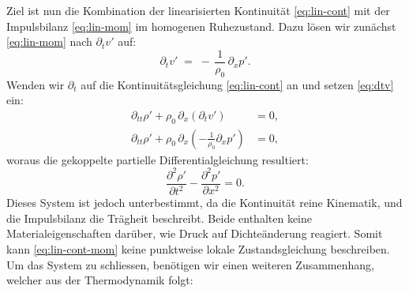 Ziel ist nun die Kombination der linearisierten Kontinuität \eqref{eq:lin-cont}
mit der Impulsbilanz \eqref{eq:lin-mom} im homogenen Ruhezustand.
Dazu lösen wir zunächst \eqref{eq:lin-mom} nach $\partial_t v'$ auf:
\begin{equation}
    \partial_t v' \;=\; -\,\frac{1}{\rho_0}\,\partial_x p'.
    \label{eq:dtv}
\end{equation}
Wenden wir $\partial_t$ auf die Kontinuitätsgleichung \eqref{eq:lin-cont}
an und setzen \eqref{eq:dtv} ein:
\begin{align*}
    \partial_{tt}\rho' + \rho_0\,\partial_x(\partial_t v') &= 0,\\
    \partial_{tt}\rho' + \rho_0\,\partial_x\!\left(-\frac{1}{\rho_0}\partial_x p'\right) &= 0,
\end{align*}
woraus die gekoppelte partielle Differentialgleichung resultiert:
\begin{equation}
    \frac{\partial^2 \rho'}{\partial t^2} - \frac{\partial^2 p'}{\partial x^2} = 0.
    \label{eq:lin-cont-mom}
\end{equation}
Dieses System ist jedoch unterbestimmt, da die Kontinuität reine Kinematik,
und die Impulsbilanz die Trägheit beschreibt.
Beide enthalten keine Materialeigenschaften darüber, wie Druck auf Dichteänderung reagiert.
Somit kann \eqref{eq:lin-cont-mom} keine punktweise lokale Zustandsgleichung beschreiben.
Um das System zu schliessen, benötigen wir einen weiteren Zusammenhang,
welcher aus der Thermodynamik folgt:

